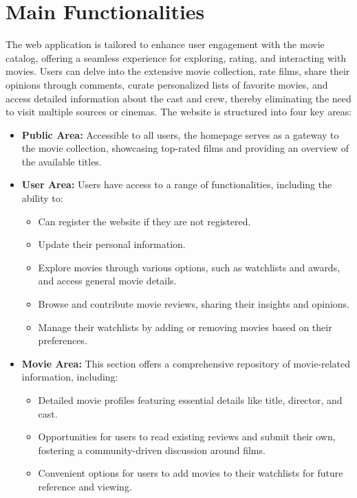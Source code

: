 \section{Main Functionalities}

The web application is tailored to enhance user engagement with the movie catalog, offering a seamless experience for exploring, rating, and interacting with movies. Users can delve into the extensive movie collection, rate films, share their opinions through comments, curate personalized lists of favorite movies, and access detailed information about the cast and crew, thereby eliminating the need to visit multiple sources or cinemas.
The website is structured into four key areas:
 \begin{itemize}
\item \textbf{Public Area:} Accessible to all users, the homepage serves as a gateway to the movie collection, showcasing top-rated films and providing an overview of the available titles.
\item \textbf{User Area:} Users have access to a range of functionalities, including the ability to:
\begin{itemize}
\item Can register the website if they are not registered. 
\item Update their personal information.
\item Explore movies through various options, such as watchlists and awards, and access general movie details.
\item Browse and contribute movie reviews, sharing their insights and opinions.
\item Manage their watchlists by adding or removing movies based on their preferences.
\end{itemize}
\item \textbf{Movie Area:} This section offers a comprehensive repository of movie-related information, including:
\begin{itemize}
\item Detailed movie profiles featuring essential details like title, director, and cast.
\item Opportunities for users to read existing reviews and submit their own, fostering a community-driven discussion around films.
\item Convenient options for users to add movies to their watchlists for future reference and viewing.
\end{itemize}

\end{itemize}
